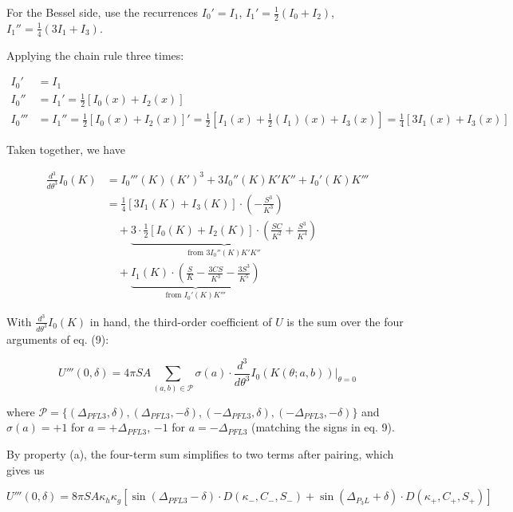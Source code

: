 \documentclass[11pt]{article}
\begin{document}
For the Bessel side, use the recurrences $I_0' = I_1$, $I_1' = \tfrac{1}{2}(I_0 + I_2)$, $I_1'' = \tfrac{1}{4}(3I_1 + I_3)$.

Applying the chain rule three times:

\begin{align*}
I_{0}' & =I_{1}\\
I_{0}'' & =I_{1}'=\frac{1}{2}[I_{0}(x)+I_{2}(x)] \\
I_{0}'''& =I_{1}''=\frac{1}{2}[I_{0}(x)+I_{2}(x)]'=\frac{1}{2}\left[ I_{1}(x)+\frac{1}{2}(I_{1})(x)+I_{3}(x) \right]=\frac{1}{4}[3I_{1}(x)+I_{3}(x)]
\end{align*}

Taken together, we have

\begin{align*}
\frac{d^3}{d\theta^3} I_0(K) & = I_0'''(K) (K')^3 + 3 I_0''(K) K' K'' + I_0'(K) K'''  \\
 & = \frac{1}{4}[3I_{1}(K)+I_{3}(K)] \cdot\left( -\frac{S^{3}}{K^{3}} \right)\\
  & \quad + \underbrace{3 \cdot \frac{1}{2}[I_0(K) + I_2(K)] \cdot \left(\frac{SC}{K^2} + \frac{S^3}{K^4}\right)}_{\text{from } 3 I_0''(K) K' K''} \\
   & \quad +\underbrace{I_1(K) \cdot \left(\frac{S}{K} - \frac{3CS}{K^3} - \frac{3 S^3}{K^5}\right)}_{\text{from } I_0'(K) K'''}
\end{align*}

With $\frac{d^3}{d\theta^3} I_0(K)$ in hand, the third-order coefficient of $U$ is the sum over the four arguments of eq. (9):

\begin{equation}
U'''(0, \delta) = 4\pi SA \sum_{(a, b) \in \mathcal{P}} \sigma(a) \cdot \frac{d^3}{d\theta^3} I_0(K(\theta; a, b)) \bigg|_{\theta = 0}
\end{equation}

where $\mathcal{P} = \{(\Delta_{PFL3}, \delta), (\Delta_{PFL3}, -\delta), (-\Delta_{PFL3}, \delta), (-\Delta_{PFL3}, -\delta)\}$ and $\sigma(a) = +1$ for $a = +\Delta_{PFL3}$, $-1$ for $a = -\Delta_{PFL3}$ (matching the signs in eq. 9).

By property (a), the four-term sum simplifies to two terms after pairing, which gives us

\begin{equation}
\boxed{U'''(0, \delta) = 8\pi SA\kappa_{h}\kappa_{g}[\sin(\Delta_{PFL3}-\delta)\cdot D(\kappa_{-},C_{-},S_{-})+\sin (\Delta_{P_{3}L}+\delta)\cdot D(\kappa_{+},C_{+},S_{+})]}
\end{equation}
\end{document}
